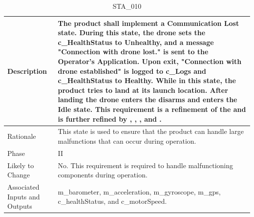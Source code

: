 \documentclass{article}
\begin{document}
\begin{table}[!h]
\begin{center}
\caption {STA\_010} 
\label{STA_010}
\begin{tabular}{ | m{3cm} | m{11cm} | }
\hline
Description & The product shall implement a Communication Lost state. During this state, the drone sets the c\_HealthStatus to Unhealthy, and a message "Connection with drone lost." is sent to the Operator's Application. Upon exit, "Connection with drone established" is logged to c\_Logs and c\_HealthStatus to Healthy. While in this state, the product tries to land at its launch location. After landing the drone enters the disarms and enters the Idle state. This requirement is a refinement of the \nameref{Communication Lost State} and is further refined by \nameref{PERF_007}, \nameref{SAFE_001}, \nameref{SAFE_003}, and \nameref{USE_003}. \\
\hline
Rationale & This state is used to ensure that the product can handle large malfunctions that can occur during operation. \\
\hline
Phase & II \\
\hline
Likely to Change & No. This requirement is required to handle malfunctioning components during operation. \\
\hline
Associated Inputs and Outputs & m\_barometer, m\_acceleration, m\_gyroscope, m\_gps, c\_healthStatus, and c\_motorSpeed. \\
\hline
\end{tabular}
\end{center}
\end{table}

\clearpage
\newpage
\end{document}
